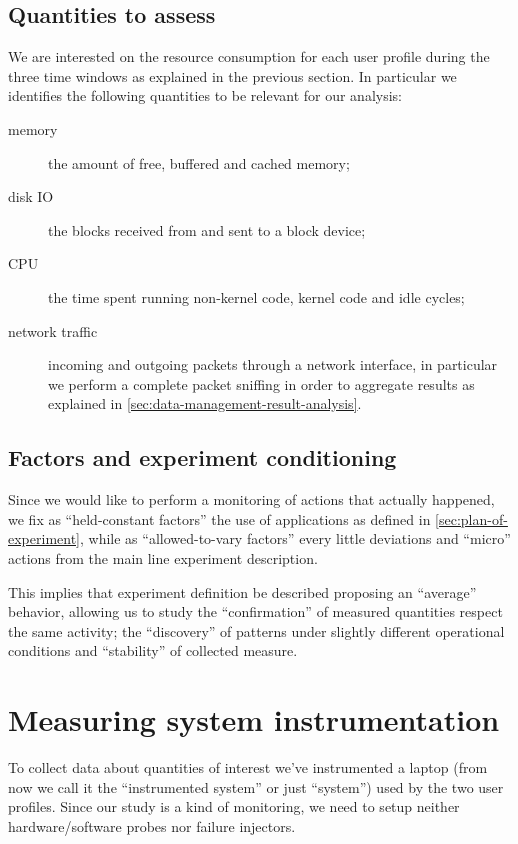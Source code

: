 \documentclass[10pt,a4paper]{article}
\begin{document}
    \subsection{Quantities to assess}
    We are interested on the resource consumption for each user
    profile during the three time windows as explained in the previous
    section. In particular we identifies the following quantities to
    be relevant for our analysis:
    \begin{description}
    \item[memory] the amount of free, buffered and cached memory;
    \item[disk IO] the blocks received from and sent to a block
      device;
    \item[CPU] the time spent running non-kernel code, kernel code and
      idle cycles;
    \item[network traffic] incoming and outgoing packets through a
      network interface, in particular we perform a complete packet
      sniffing in order to aggregate results as explained in
      \autoref{sec:data-management-result-analysis}.
    \end{description}


    \subsection{Factors and experiment conditioning}
    Since we would like to perform a monitoring of actions that
    actually happened, we fix as ``held-constant factors'' the use of
    applications as defined in \autoref{sec:plan-of-experiment}, while
    as ``allowed-to-vary factors'' every little deviations and
    ``micro'' actions from the main line experiment description. 

    This implies that experiment definition be described proposing an
    ``average'' behavior, allowing us to study the ``confirmation'' of
    measured quantities respect the same activity; the ``discovery''
    of patterns under slightly different operational conditions and
    ``stability'' of collected measure.

    \section{Measuring system instrumentation}
    To collect data about quantities of interest we've instrumented a
    laptop (from now we call it the ``instrumented system'' or just
    ``system'') used by the two user profiles. Since our study is a
    kind of monitoring, we need to setup neither hardware/software
    probes nor failure injectors.
\end{document}
